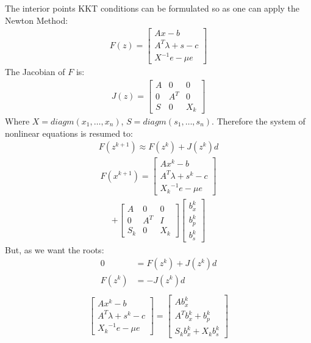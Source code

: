 \documentclass[a4paper]{IEEEtran}
\begin{document}
The interior points KKT conditions can be formulated so as one can apply the Newton Method:
 \begin{align*}
	F(z) = \begin{bmatrix}
			Ax - b\\
			A^{T}\lambda + s - c\\
			X^{-1} e - \mu e
		\end{bmatrix}
\end{align*} 
The Jacobian of $F$ is:
 \begin{align*}
	J(z) = \begin{bmatrix}
			A & 0 & 0\\
			0 & A^T & 0\\
			S & 0 & X_k
		\end{bmatrix}
\end{align*} 
Where $X=diagm(x_1,\dots,x_n)$, $S=diagm(s_1,\dots,s_n)$. Therefore the system of nonlinear equations is resumed to:
\begin{align}
	F(z^{k+1}) \approx F(z^k) + J(z^k)d
\end{align} 
 \begin{align*}
	F(x^{k+1}) =\begin{bmatrix}
			Ax^k - b\\
			A^{T}\lambda + s^k - c\\
			{X_k}^{-1} e - \mu e
		\end{bmatrix} 
\end{align*} 
 \begin{align*}
	 + \begin{bmatrix}
			A & 0 & 0\\
			0 & A^T & I\\
			S_k & 0 & X_k
		\end{bmatrix} \begin{bmatrix}
			b_x^k\\
			b_p^k\\
			b_s^k
		\end{bmatrix}
\end{align*}
But, as we want the roots:
\begin{align*}
	0 &= F(z^k) + J(z^k)d \\
	F(z^k) &= - J(z^k)d \\
\end{align*} 
 \begin{align*}
	 \begin{bmatrix}
			Ax^k - b\\
			A^{T}\lambda + s^k - c\\
			{X_k}^{-1} e - \mu e
		\end{bmatrix} =
		 \begin{bmatrix}
			A b_x^k\\
			A^T b_x^k + b_p^k\\
			S_k b_x^k + X_k b_s^k
		\end{bmatrix}
\end{align*}  
\end{document}
